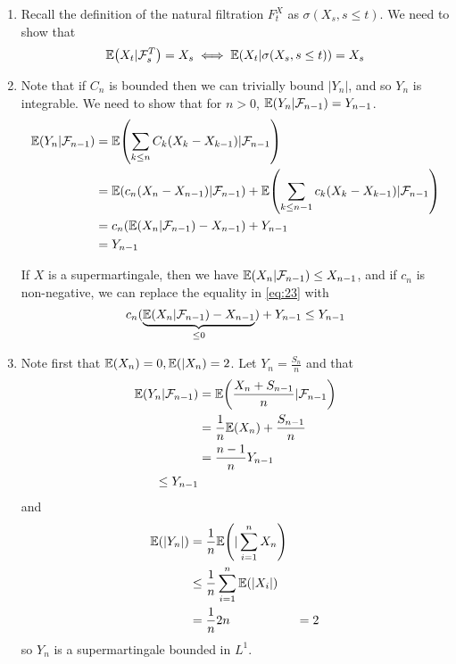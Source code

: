 \begin{enumerate}
\item Recall the definition of the natural filtration $F_{t}^{X}$ as
  $\sigma(X_{s}, s \leq t)$.  We need to show that
  \begin{equation}
    \label{eq:20}
    \E{X_{t}|\mathcal{F}_{s}^{T}} = X_{s} \iff \E{X_{t} |
      \sigma(X_{s}, s \leq t)} = X_{s}
  \end{equation}
\item Note that if $C_{n}$ is bounded then we can trivially bound
  $|Y_{n}|$, and so $Y_{n}$ is integrable.  We need to show that for
  $n > 0$, $\E{Y_{n} | \mathcal{F}_{n-1}} = Y_{n-1}$. 
  \begin{align}
    \label{eq:21}
    \E{Y_{n} | \mathcal{F}_{n-1}} &= \E{\sum_{k \leq n} C_{k} (X_{k} -
      X_{k-1}) | \mathcal{F}_{n-1}} \\
    &= \E{c_{n}(X_{n} - X_{n-1}) | \mathcal{F}_{n-1}} + \E{\sum_{k \leq
        n-1} c_{k} (X_{k} - X_{k-1}) | \mathcal{F}_{n-1}} \\
    &= c_{n} (\E{X_{n} | \mathcal{F}_{n-1}} - X_{n-1}) + Y_{n-1} \\
    \label{eq:23}
    &= Y_{n-1}
  \end{align}

  If $X$ is a supermartingale, then we have
  $\E{X_{n} | \mathcal{F}_{n-1}} \leq X_{n-1}$, and if $c_{n}$ is
  non-negative, we can replace the equality in \eqref{eq:23} with
  \begin{equation}
    \label{eq:24}
    c_{n}(\underbrace{\E{X_{n} | \mathcal{F}_{n-1}} - X_{n-1}}_{\leq 0}) + Y_{n-1} \leq Y_{n-1}
  \end{equation}
\item Note first that $\E{X_{n}} = 0, \E{|X_{n}} = 2$. Let $Y_{n} =
  \frac{S_{n}}{n}$ and that
  \begin{align}
    \label{eq:22}
    \E{Y_{n} | \mathcal{F}_{n-1}} &= \E{\frac{X_{n} + S_{n-1}}{n} |
      \mathcal{F}_{n-1}} \\
    &= \frac{1}{n}\E{X_{n}} + \frac{S_{n-1}}{n} \\
    &= \frac{n-1}{n}Y_{n-1} \\
    \leq Y_{n-1}
  \end{align} and
  \begin{align}
    \label{eq:25}
    \E{|Y_{n}|} &= \frac{1}{n}\E{|\sum_{i=1}^{n} X_{n}} \\
    &\leq \frac{1}{n}\sum_{i=1}^{n} \E{|X_{i}|}\\
    &= \frac{1}{n} 2n
    &= 2
  \end{align}
  so $Y_{n}$ is a supermartingale bounded in $L^{1}$.


\end{enumerate}
